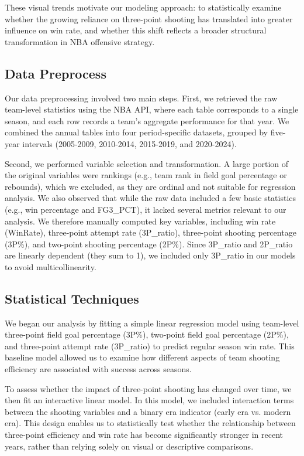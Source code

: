 \documentclass[11pt, a4paper]{article} %
\begin{document}
These visual trends motivate our modeling approach: to statistically examine whether the growing reliance on three-point shooting 
has translated into greater influence on win rate, and whether this shift reflects a broader structural transformation in NBA 
offensive strategy.


\subsection{Data Preprocess}
Our data preprocessing involved two main steps. First, we retrieved the raw team-level statistics using the NBA API, 
where each table corresponds to a single season, and each row records a team's aggregate performance for that year. 
We combined the annual tables into four period-specific datasets, grouped by five-year intervals (2005-2009, 2010-2014, 2015-2019, 
and 2020-2024).

Second, we performed variable selection and transformation. A large portion of the original variables were rankings (e.g., team 
rank in field goal percentage or rebounds), which we excluded, as they are ordinal and not suitable for regression analysis. 
We also observed that while the raw data included a few basic statistics (e.g., win percentage and FG3\_PCT), it lacked several 
metrics relevant to our analysis. We therefore manually computed key variables, including win rate (WinRate), three-point attempt 
rate (3P\_ratio), three-point shooting percentage (3P\%), and two-point shooting percentage (2P\%). Since 3P\_ratio and 2P\_ratio 
are linearly dependent (they sum to 1), we included only 3P\_ratio in our models to avoid multicollinearity.

\subsection{Statistical Techniques}
We began our analysis by fitting a simple linear regression model using team-level three-point field goal percentage (3P\%), 
two-point field goal percentage (2P\%), and three-point attempt rate (3P\_ratio) to predict regular season win rate. This baseline 
model allowed us to examine how different aspects of team shooting efficiency are associated with success across seasons.

To assess whether the impact of three-point shooting has changed over time, we then fit an interactive linear model. In this model, 
we included interaction terms between the shooting variables and a binary era indicator (early era vs. modern era). This design 
enables us to statistically test whether the relationship between three-point efficiency and win rate has become significantly 
stronger in recent years, rather than relying solely on visual or descriptive comparisons.
\end{document}
